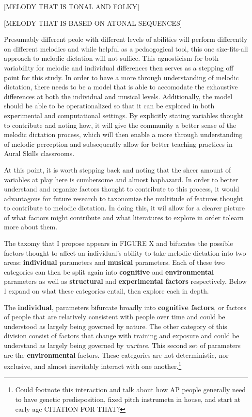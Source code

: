 \documentclass[]{book}
\let\rmarkdownfootnote\footnote%
\def\footnote{\protect\rmarkdownfootnote}
\theoremstyle{definition}
\theoremstyle{definition}
\theoremstyle{definition}
\theoremstyle{remark}
\begin{document}
{[}MELODY THAT IS TONAL AND FOLKY{]}

{[}MELODY THAT IS BASED ON ATONAL SEQUENCES{]}

Presumably different peole with different levels of abilities will
perform differently on different melodies and while helpful as a
pedaogogical tool, this one size-fits-all approach to melodic dictation
will not suffice. This agnosticism for both variability for melodic and
individual differences then serves as a stepping off point for this
study. In order to have a more through understanding of melodic
dictation, there needs to be a model that is able to accomodate the
exhaustive differences at both the individual and musical levels.
Additionally, the model should be able to be operationalized so that it
can be explored in both experimental and computational settings. By
explicitly stating variables thought to contribute and noting how, it
will give the community a better sense of the melodic dictation process,
which will then enable a more through understanding of melodic
perception and subsequently allow for better teaching practices in Aural
Skills classrooms.

At this point, it is worth stepping back and noting that the sheer
amount of variables at play here is cumbersome and almost haphazard. In
order to better understand and organize factors thought to contribute to
this process, it would advantagous for future research to taxonomize the
multitude of features thought to contribute to melodic dictation. In
doing this, it wil allow for a clearer picture of what factors might
contribute and what literatures to explore in order tolearn more about
them.

The taxomy that I propose appears in FIGURE X and bifucates the possible
factors thought to affect an individual's ability to take melodic
dictation into two areas: \textbf{individual} parameters and
\textbf{musical} parameters. Each of these two categories can then be
split again into \textbf{cognitive} and \textbf{environmental}
parameters as well as \textbf{structural} and \textbf{experimental
factors} respectively. Below I expand on what these categories entail,
then explore each in depth.

The \textbf{individual}, parameters bifurcate broadly into
\textbf{cognitive factors}, or factors of people that are relatively
consistent with people over time and could be understood as largely
being governed by nature. The other category of this division consist of
factors that change with training and exposure and could be understand
as largely being governed by \emph{nurture}. This second set of
parameters are the \textbf{environmental} factors. These categories are
not deterministic, nor exclusive, and almost inevitably interact with
one another.\footnote{Could footnote this interaction and talk about how
  AP people generally need to have genetic predisposition, fixed pitch
  instrumetn in house, and start at early age CITATION FOR THAT?}
\end{document}
